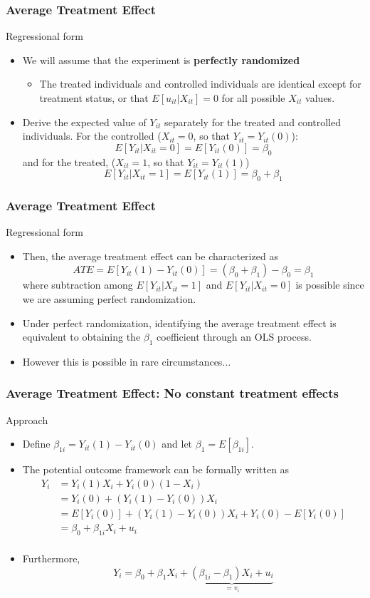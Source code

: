 \documentclass[compress]{beamer}
\begin{document}
\begin{frame}
\frametitle{Average Treatment Effect}
Regressional form
\begin{itemize}
\item We will assume that the experiment is \textbf{perfectly randomized} 
\begin{itemize}
\item The treated individuals and controlled individuals are identical except for treatment status, or that $E[u_{it}|X_{it}]=0$ for all possible $X_{it}$ values. 
\end{itemize}
\item Derive the expected value of $Y_{it}$ separately for the treated and controlled individuals. For the controlled ($X_{it}=0$, so that $Y_{it}=Y_{it}(0)$):
\[
E[Y_{it}|X_{it}=0]=E[Y_{it}(0)]=\beta_0
\]
and for the treated, ($X_{it}=1$, so that $Y_{it}=Y_{it}(1)$)
\[
E[Y_{it}|X_{it}=1]=E[Y_{it}(1)]=\beta_0+\beta_1
\]
\end{itemize}
\end{frame}

\begin{frame}
\frametitle{Average Treatment Effect}
Regressional form
\begin{itemize}
\item Then, the average treatment effect can be characterized as
\[
ATE = E[Y_{it}(1)-Y_{it}(0)]=(\beta_0+\beta_1)-\beta_0=\beta_1
\]
where subtraction among $E[Y_{it}|X_{it}=1]$ and $E[Y_{it}|X_{it}=0]$ is possible since we are assuming perfect randomization.
\item Under perfect randomization, identifying the average treatment effect is equivalent to obtaining the $\beta_1$ coefficient through an OLS process.
\item However this is possible in rare circumstances...
\end{itemize}
\end{frame}

\begin{frame}
\frametitle{Average Treatment Effect: No constant treatment effects}
Approach
\begin{itemize}
\item Define $\beta_{1i}= Y_{it}(1)-Y_{it}(0)$ and let $\beta_1=E[\beta_{1i}]$. 
\item The potential outcome framework can be formally written as
\[
\begin{aligned}
Y_i & = Y_i(1)X_i+Y_i(0)(1-X_i)\\
&=Y_i(0)+(Y_i(1)-Y_i(0))X_i \\
&=E[Y_i(0)]+(Y_i(1)-Y_i(0))X_i+Y_i(0)-E[Y_i(0)]\\
&=\beta_0+\beta_{1i}X_i+u_i   \\
\end{aligned} 
\]
\item Furthermore, 
\[
Y_i = \beta_0 + \beta_1X_i+\underbrace{(\beta_{1i}-\beta_1)X_i+u_i}_{=v_i}
\]
\end{itemize}
\end{frame}
\end{document}
